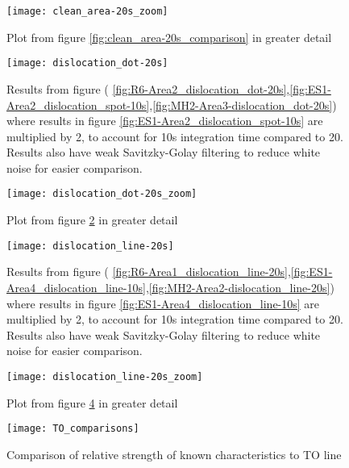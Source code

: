 \begin{figure}[H]
\centering
\texttt{[image: clean\_area-20s\_zoom]}
\caption[Comparisons in a clean area]{Plot from figure \ref{fig:clean_area-20s_comparison} in greater detail}
\label{fig:clean_area-20s_zoom_comparison}%
\end{figure}

\begin{figure}[H]
\centering
\texttt{[image: dislocation\_dot-20s]}
\caption[Comparisons in a dislocation dot]{Results from figure ( \ref{fig:R6-Area2_dislocation_dot-20s},\ref{fig:ES1-Area2_dislocation_spot-10s},\ref{fig:MH2-Area3-dislocation_dot-20s}) where results in figure \ref{fig:ES1-Area2_dislocation_spot-10s} are multiplied by 2, to account for 10s integration time compared to 20. Results also have weak Savitzky-Golay filtering to reduce white noise for easier comparison.}
\label{fig:dislocation_dot-20s_comparison}%
\end{figure}

\begin{figure}[H]
\centering
\texttt{[image: dislocation\_dot-20s\_zoom]}
\caption[Comparisons in a dislocation dot]{Plot from figure \ref{fig:dislocation_dot-20s_comparison} in greater detail}
\label{fig:dislocation_dot-20s_zoom_comparison}%
\end{figure}

\begin{figure}[H]
\centering
\texttt{[image: dislocation\_line-20s]}
\caption[Comparisons in a dislocation line]{Results from figure ( \ref{fig:R6-Area1_dislocation_line-20s},\ref{fig:ES1-Area4_dislocation_line-10s},\ref{fig:MH2-Area2-dislocation_line-20s}) where results in figure \ref{fig:ES1-Area4_dislocation_line-10s} are multiplied by 2, to account for 10s integration time compared to 20. Results also have weak Savitzky-Golay filtering to reduce white noise for easier comparison.}
\label{fig:dislocation_line-20s_comparison}%
\end{figure}


\begin{figure}[H]
\centering
\texttt{[image: dislocation\_line-20s\_zoom]}
\caption[Comparisons in a dislocation line]{Plot from figure \ref{fig:dislocation_line-20s_comparison} in greater detail}
\label{fig:dislocation_line-20s_zoom_comparison}%
\end{figure}

\begin{figure}[H]
\centering
\texttt{[image: TO\_comparisons]}
\caption[Comparison or relative strength]{Comparison of relative strength of known characteristics to TO line}
\label{fig:TO_comparisons}%
\end{figure}
